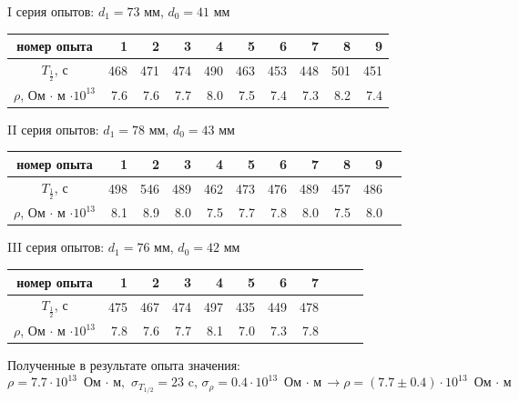 \documentclass[a4paper, 12pt]{article}
\begin{document}
I серия опытов: $d_1 = 73$ мм, $d_0 = 41$ мм

\vspace{0.5cm}

\begin{tabular}{|c|r|r|r|r|r|r|r|r|r|}
\hline
номер опыта & 1 & 2 & 3 & 4 & 5 & 6 & 7 & 8 & 9 \\
\hline
$T_{\frac{1}{2}}$, с & 468 & 471 & 474 & 490 & 463 & 453 & 448 & 501 & 451 \\
\hline
$\rho$, Ом $\cdot$ м $\cdot 10 ^{13}$ & 7.6 & 7.6 & 7.7 & 8.0 & 7.5 & 7.4 & 7.3 & 8.2 & 7.4\\
\hline
\end{tabular}

\vspace{1.5cm}

II серия опытов: $d_1 = 78$ мм, $d_0 = 43$ мм

\vspace{0.5cm}

\begin{tabular}{|c|r|r|r|r|r|r|r|r|r|r|}
\hline
номер опыта & 1 & 2 & 3 & 4 & 5 & 6 & 7 & 8 & 9 \\
\hline
$T_{\frac{1}{2}}$, с & 498 & 546  & 489 & 462 & 473 & 476 & 489 & 457 & 486  \\
\hline
$\rho$, Ом $\cdot$ м $\cdot 10 ^{13}$ & 8.1 & 8.9 & 8.0 & 7.5 & 7.7 & 7.8 & 8.0 & 7.5 & 8.0\\
\hline
\end{tabular}

\vspace{1.5cm}

III серия опытов: $d_1 = 76$ мм, $d_0 = 42$ мм

\vspace{0.5cm}

\begin{tabular}{|c|r|r|r|r|r|r|r|r|r|r|}
\hline
номер опыта & 1 & 2 & 3 & 4 & 5 & 6 & 7 \\
\hline
$T_{\frac{1}{2}}$, с & 475  & 467 & 474 & 497  & 435 & 449 & 478  \\
\hline
$\rho$, Ом $\cdot$ м $\cdot 10 ^{13}$ & 7.8 & 7.6 & 7.7 & 8.1 & 7.0  & 7.3 & 7.8\\
\hline
\end{tabular}

\vspace{1cm}

Полученные в результате опыта значения:
$$ \rho = 7.7 \cdot 10^{13} \text{ Ом $\cdot$ м, } \sigma_{T_{1/2}} = 23 \text{ c, } \sigma_{\rho} = 0.4\cdot 10^{13} \text{ Ом $\cdot$ м} \rightarrow \rho = (7.7 \pm 0.4) \cdot 10^{13} \text{ Ом $\cdot$ м} $$
\end{document}
